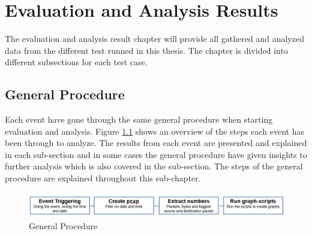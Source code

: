 \chapter{Evaluation and Analysis Results}
The evaluation and analysis result chapter will provide all gathered and analyzed data from the different test runned in this thesis. The chapter is divided into different subsections for each test case. 

\section{General Procedure}
Each event have gone through the same general procedure when starting evaluation and analysis. Figure \ref{fig:GeneralProcedure} shows an overview of the steps each event has been through to analyze. The results from each event are presented and explained in each sub-section and in some cases the general procedure have given insights to further analysis which is also covered in the sub-section. The steps of the general procedure are explained throughout this sub-chapter.

\begin{figure}[H]
    \centering
    \includegraphics[width=\textwidth]{figures/GeneralProcedure.png}
    \caption{General Procedure}
    \label{fig:GeneralProcedure}
\end{figure}

